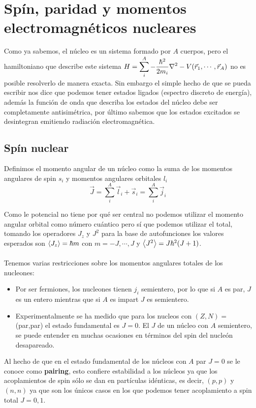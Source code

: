 \section{Spín, paridad y momentos electromagnéticos nucleares}
Como ya sabemos, el núcleo es un sistema formado por $A$ cuerpos, pero el hamiltoniano que describe este sistema $H= \displaystyle \sum_i^A -\dfrac{\hbar^2}{2m_i} \laplacian-V(\vec{r}_1,\cdots, \vec{r}_A)$ no es posible resolverlo de manera exacta. Sin embargo el simple hecho de que se pueda escribir nos dice que podemos tener estados ligados (espectro discreto de energía), además la función de onda que describa los estados del núcleo debe ser completamente antisimétrica, por último sabemos que los estados excitados se desintegran emitiendo radiación electromagnética.

\subsection{Spín nuclear}

Definimos el momento angular de un núcleo como la suma de los momentos angulares de spin $s_i$ y momentos angulares orbitales $l_i$
\begin{equation}
    \vec{J}=\sum_i^A \vec{l}_i+\vec{s}_i=\sum_i^A \vec{j}_i
\end{equation}

Como le potencial no tiene por qué ser central no podemos utilizar el momento angular orbital como número cuántico pero sí que podemos utilizar el total, tomando los operadores $J_z$ y $J^2$ para la base de autofunciones los valores esperados son $\expval{J_z}=\hbar m$ con $m=-J,\cdots, J$ y $ \expval{J^2}=J\hbar^2(J+1)$.
\\\\
\noindent Tenemos varias restricciones sobre los momentos angulares totales de los nucleones:
\begin{itemize}
    \item Por ser fermiones, los nucleones tienen $j_i$ semientero, por lo que si $A$ es par, $J$ es un entero mientras que si $A$ es impart $J$ es semientero.
    \item Experimentalmente se ha medido que para los nucleos con $(Z,N)=$ (par,par) el estado fundamental es $J=0$. El $J$ de un núcleo con $A$ semientero, se puede entender en muchas ocasiones en términos del spin del nucleón desapareado.
\end{itemize}

\noindent Al hecho de que en el estado fundamental de los núcleos con $A$ par $J=0$ se le conoce como \textbf{pairing}, esto confiere estabilidad a los núcleos ya que los acoplamientos de spin sólo se dan en partículas idénticas, es decir, $(p,p)$ y $(n,n)$ ya que son los únicos casos en los que podemos tener acoplamiento a spin total $J=0,1$.

